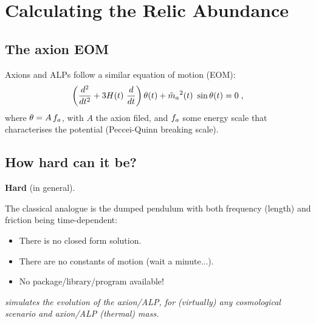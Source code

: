 \documentclass[10pt,utf8,compress,xcolor=dvipsnames]{beamer}
\begin{document}
\section{Calculating the Relic Abundance}
\subsection{The axion EOM}
\begin{frame}{\insertsubsectionhead}
	Axions and ALPs follow a similar equation of motion (EOM):
	\begin{equation*}
		\left( \dfrac{d^2}{d t^2} + 3 H(t) \ \dfrac{d}{d t}  \right) \theta(t) + \tilde m_{a}{}^2(t) \ \sin \theta(t) = 0 \; ,
	\end{equation*}	
	where $\theta= A \, f_{a}{}$, with $A$ the axion filed, and $f_{a}{}$ some energy scale that characterises the potential (Peccei-Quinn breaking scale).
	
	
\end{frame}

\subsection{How hard can it be?}
\begin{frame}{\insertsubsectionhead}
	\begin{center}
		\textbf{Hard} (in general).\\[1cm]
	\end{center}	
	
	The classical analogue is the dumped pendulum with both frequency (length) and friction being time-dependent:
	\begin{itemize}
		\item There is no closed form solution.
		\item There are no constants of motion (wait a minute...).
		\item No package/library/program available!\pause\\[1cm]
	\end{itemize}
	
	\begin{center}
		{\sl \mimes simulates the evolution of the axion/ALP, for (virtually) any cosmological scenario and axion/ALP (thermal) mass.}
	\end{center}		
\end{frame}
\end{document}
